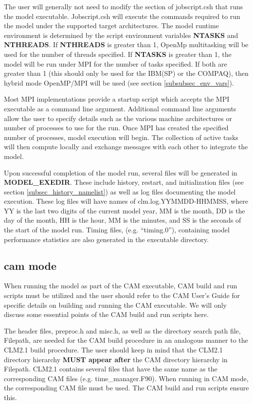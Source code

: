 The user will generally not need to modify the section of
jobscript.csh that runs the model executable.  Jobscript.csh will
execute the commands required to run the model under the supported
target architectures.  The model runtime environment is determined by
the script environment variables {\bf NTASKS} and {\bf NTHREADS}. If
{\bf NTHREADS} is greater than 1, OpenMp multitasking will be used for
the number of threads specified.  If {\bf NTASKS} is greater than 1,
the model will be run under MPI for the number of tasks specified. If
both are greater than 1 (this should only be used for the IBM(SP) or
the COMPAQ), then hybrid mode OpenMP/MPI will be used (see section
\ref{subsubsec_env_vars}).

Most MPI implementations provide a startup script which accepts the
MPI executable as a command line argument.  Additional command line
arguments allow the user to specify details such as the various
machine architectures or number of processes to use for the run. Once
MPI has created the specified number of processes, model execution
will begin. The collection of active tasks will then compute locally
and exchange messages with each other to integrate the model.

Upon successful completion of the model run, several files will be
generated in {\bf MODEL\_EXEDIR}. These include history, restart, and
initialization files (see section \ref{subsec_history_namelist}) as
well as log files documenting the model execution. These log files
will have names of clm.log.YYMMDD-HHMMSS, where YY is the last two
digits of the current model year, MM is the month, DD is the day of
the month, HH is the hour, MM is the minutes, and SS is the seconds of
the start of the model run. Timing files, (e.g. ``timing.0''),
containing model performance statistics are also generated in the
executable directory.

\subsection {cam mode}

When running the model as part of the CAM executable, CAM build and
run scripts must be utilized and the user should refer to the CAM
User's Guide for specific details on building and running the CAM
executable. We will only discuss some essential points of the CAM
build and run scripts here.

The header files, preproc.h and misc.h, as well as the directory
search path file, Filepath, are needed for the CAM build procedure in
an analogous manner to the CLM2.1 build procedure.  The user should
keep in mind that the CLM2.1 directory hierarchy {\bf MUST appear
after} the CAM directory hierarchy in Filepath. CLM2.1 contains
several files that have the same name as the corresponding CAM files
(e.g. time\_manager.F90). When running in CAM mode, the corresponding
CAM file must be used. The CAM build and run scripts ensure this.

